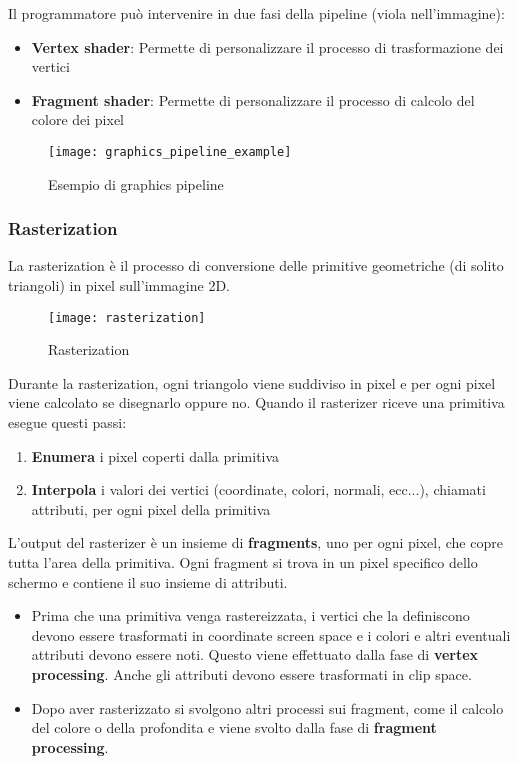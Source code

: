 \documentclass[a4paper]{article}
\begin{document}
Il programmatore può intervenire in due fasi della pipeline (viola nell'immagine):
\begin{itemize}
  \item \textbf{Vertex shader}: Permette di personalizzare il processo di trasformazione
    dei vertici
  \item \textbf{Fragment shader}: Permette di personalizzare il processo di calcolo del colore
    dei pixel
\end{itemize}
\begin{figure}[H]
  \centering
  \texttt{[image: graphics\_pipeline\_example]}
  \caption{Esempio di graphics pipeline}
\end{figure}


\subsubsection{Rasterization}
La rasterization è il processo di conversione delle primitive geometriche (di solito
triangoli) in pixel sull'immagine 2D.
\begin{figure}[H]
  \centering
  \texttt{[image: rasterization]}
  \caption{Rasterization}
\end{figure}
\noindent
Durante la rasterization, ogni triangolo viene suddiviso in pixel e per ogni pixel
viene calcolato se disegnarlo oppure no.
\vspace{1em}
\noindent
Quando il rasterizer riceve una primitiva esegue questi passi:
\begin{enumerate}
  \item \textbf{Enumera} i pixel coperti dalla primitiva
  \item \textbf{Interpola} i valori dei vertici (coordinate, colori, normali, ecc...),
    chiamati attributi, per ogni pixel della primitiva
\end{enumerate}
L'output del rasterizer è un insieme di \textbf{fragments}, uno per ogni pixel, che
copre tutta l'area della primitiva. Ogni fragment si trova in un pixel specifico dello
schermo e contiene il suo insieme di attributi.

\vspace{1em}
\noindent
\begin{itemize}
  \item 
    Prima che una primitiva venga rastereizzata, i vertici che la definiscono devono essere
    trasformati in coordinate screen space e i colori e altri eventuali attributi devono
    essere noti. Questo viene effettuato dalla fase di \textbf{vertex processing}. Anche
    gli attributi devono essere trasformati in clip space.

  \item Dopo aver rasterizzato si svolgono altri processi sui fragment, come il calcolo
    del colore o della profondita e viene svolto dalla fase di \textbf{fragment processing}.
\end{itemize}
\end{document}
